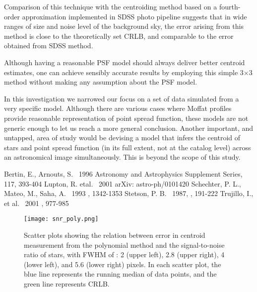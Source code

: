 \documentclass[12pt, preprint]{aastex}
\begin{document}
Comparison of this technique with the centroiding method based on a fourth-order approximation implemented in SDSS photo pipeline suggests that in wide ranges of size and noise level of the background sky, the error arising from this method is close to the theoretically set CRLB, and comparable to the error obtained from SDSS method. 

Although having a reasonable PSF model should always deliver better centroid estimates, one can achieve sensibly accurate results by employing this simple 3$\times$3 method without making any assumption about the PSF model.

In this investigation we narrowed our focus on a set of data simulated from a very specific model. Although there are various cases where Moffat profiles provide reasonable representation of point spread function, these models are not generic enough to let us reach a more general conclusion. Another important, and untapped, area of study would be devising a model that infers the centroid of stars and point spread function (in its full extent, not at the catalog level) across an astronomical image simultaneously. This is beyond the scope of this study. 




\begin{thebibliography}{70}

 Bertin, E., Arnouts, S. \ 1996  Astronomy and Astrophysics Supplement Series, 117, 393-404
 Lupton, R. etal. \ 2001  arXiv: astro-ph/0101420
 Schechter, P. L., Mateo, M., Saha, A. \ 1993 \pasp, 1342-1353
 Stetson, P. B. \ 1987, \pasp, 191-222
 Trujillo, I., et al. \ 2001 \mnras, 977-985

\end{thebibliography}

\clearpage


\begin{figure}[!htb]
  \texttt{[image: snr\_poly.png]}
\endminipage
\caption{Scatter plots showing the relation between error in centroid measurement from the polynomial method and the signal-to-noise ratio of stars, with FWHM of : 2 (upper left), 2.8 (upper right), 4 (lower left), and 5.6 (lower right) pixels. In each scatter plot, the blue line represents the running median of data points, and the green line represents CRLB.}\label{1}
\end{figure}
\end{document}
